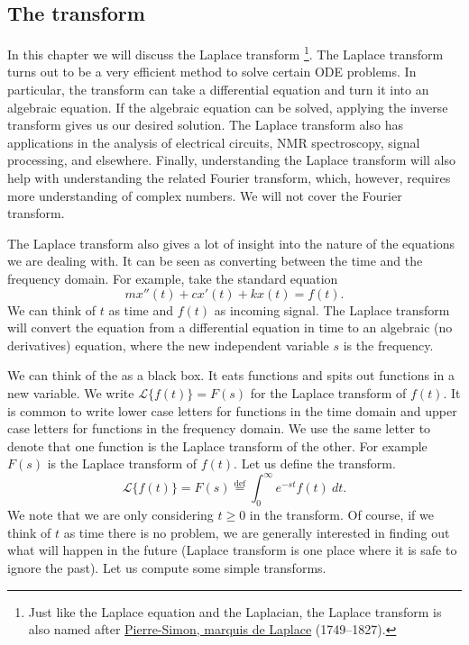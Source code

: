 \documentclass[12pt]{book}
\begin{document}

\subsection{The transform}

In this chapter we will discuss the Laplace transform%
\footnote{Just like the Laplace equation and the Laplacian, the Laplace
transform is also named after 
\href{http://en.wikipedia.org/wiki/Laplace}{Pierre-Simon, marquis de Laplace}
(1749--1827).}.
The Laplace transform
turns out to be a very efficient method to solve certain ODE problems.  In
particular, the transform can take a differential equation and turn it into
an algebraic equation.  If the algebraic equation can be solved, applying the
inverse transform gives us our desired solution.
The Laplace transform also has applications in
the analysis of 
electrical circuits, NMR spectroscopy, signal processing, and elsewhere.
Finally,
understanding the Laplace
transform will also help with understanding the related Fourier transform,
which, however, requires more
understanding of complex numbers.  We will not cover the Fourier transform.

The Laplace transform also gives a lot of insight into the nature of the
equations we are dealing with.  It can be seen as converting between the time
and the frequency domain.  For example, take the standard equation
\begin{equation*}
m x''(t) + c x'(t) + k x(t) = f(t) .
\end{equation*}
We can think of $t$ as time and $f(t)$ as incoming signal.  The Laplace
transform will convert the equation from a differential equation in time to
an algebraic (no derivatives) equation, where the new independent variable
$s$ is the frequency.

We can think of the \emph{} as a black box.  It
eats functions and spits out functions in a new variable.  We write
$\mathcal{L} \{ f(t) \} = F(s)$ for the Laplace transform of $f(t)$.  It is common to write lower case letters for
functions in the time domain and upper case letters for functions in the
frequency domain.  We use the same letter to denote that one function
is the Laplace transform of the other.  For example $F(s)$ is the Laplace
transform of $f(t)$.  Let us define the transform.
\begin{equation*}
\mathcal{L} \{ f(t) \} =
F(s) \overset{\text{def}}{=} \int_0^\infty e^{-st} f(t) ~ dt .
\end{equation*}
We note that we are only considering $t \geq 0$ in the transform.  Of course,
if we think of $t$ as time there is no problem, we are generally interested in
finding out what will happen in the future (Laplace transform is one place
where it is safe to ignore the past).  Let us compute some simple
transforms.
\end{document}
